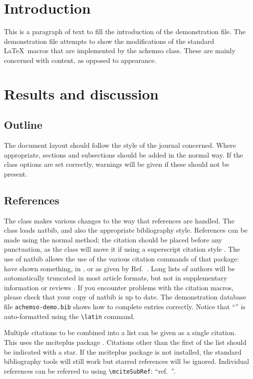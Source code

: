 \documentclass[journal=jacsat,manuscript=communication]{achemso}
\begin{document}
\section{Introduction}
This is a paragraph of text to fill the introduction of the
demonstration file.  The demonstration file attempts to show the
modifications of the standard \LaTeX\ macros that are implemented by
the \textsf{achemso} class.  These are mainly concerned with content,
as opposed to appearance.

\section{Results and discussion}

\subsection{Outline}

The document layout should follow the style of the journal concerned.
Where appropriate, sections and subsections should be added in the
normal way. If the class options are set correctly, warnings will be
given if these should not be present.

\subsection{References}

The class makes various changes to the way that references are
handled.  The class loads \textsf{natbib}, and also the
appropriate bibliography style.  References can be made using
the normal method; the citation should be placed before any
punctuation, as the class will move it if using a superscript
citation style
\cite{Mena2000,Abernethy2003,Friedman-Hill2003,EuropeanCommission2008}.
The use of \textsf{natbib} allows the use of the various citation
commands of that package: \citeauthor{Abernethy2003} have shown
something, in \citeyear{Cotton1999}, or as given by
Ref.~.  Long lists of authors will be
automatically truncated in most article formats, but not in
supplementary information or reviews \cite{Pople2003}. If you
encounter problems with the citation macros, please check that
your copy of \textsf{natbib} is up to date. The demonstration
database file \texttt{achemso-demo.bib} shows how to complete
entries correctly. Notice that ``'' is auto-formatted
using the \texttt{\textbackslash latin} command.

Multiple citations to be combined into a list can be given as
a single citation.  This uses the \textsf{mciteplus} package
\cite{Johnson1972,*Arduengo1992,*Eisenstein2005,*Arduengo1994}.
Citations other than the first of the list should be indicated
with a star. If the \textsf{mciteplus} package is not installed,
the standard bibliography tools will still work but starred
references will be ignored. Individual references can be referred
to using \texttt{\textbackslash mciteSubRef}:
``ref.~''.
\end{document}

